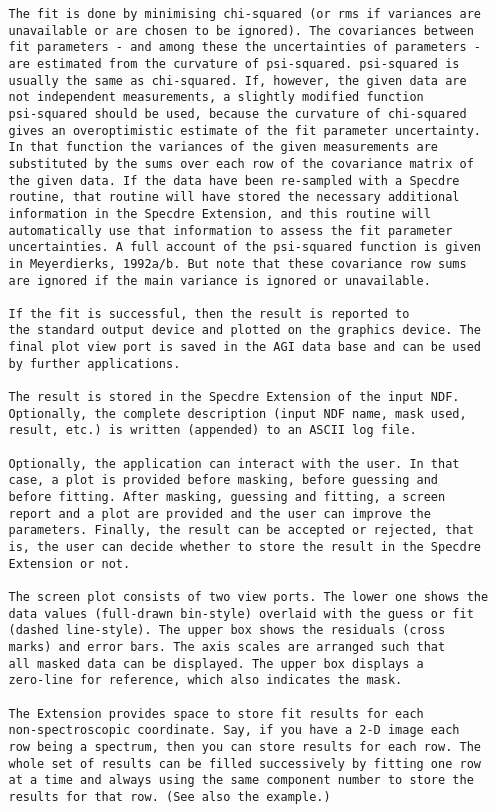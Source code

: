 \begin{description}
\begin{verbatim}
   The fit is done by minimising chi-squared (or rms if variances are
   unavailable or are chosen to be ignored). The covariances between
   fit parameters - and among these the uncertainties of parameters -
   are estimated from the curvature of psi-squared. psi-squared is
   usually the same as chi-squared. If, however, the given data are
   not independent measurements, a slightly modified function
   psi-squared should be used, because the curvature of chi-squared
   gives an overoptimistic estimate of the fit parameter uncertainty.
   In that function the variances of the given measurements are
   substituted by the sums over each row of the covariance matrix of
   the given data. If the data have been re-sampled with a Specdre
   routine, that routine will have stored the necessary additional
   information in the Specdre Extension, and this routine will
   automatically use that information to assess the fit parameter
   uncertainties. A full account of the psi-squared function is given
   in Meyerdierks, 1992a/b. But note that these covariance row sums
   are ignored if the main variance is ignored or unavailable.

   If the fit is successful, then the result is reported to
   the standard output device and plotted on the graphics device. The
   final plot view port is saved in the AGI data base and can be used
   by further applications.

   The result is stored in the Specdre Extension of the input NDF.
   Optionally, the complete description (input NDF name, mask used,
   result, etc.) is written (appended) to an ASCII log file.

   Optionally, the application can interact with the user. In that
   case, a plot is provided before masking, before guessing and
   before fitting. After masking, guessing and fitting, a screen
   report and a plot are provided and the user can improve the
   parameters. Finally, the result can be accepted or rejected, that
   is, the user can decide whether to store the result in the Specdre
   Extension or not.

   The screen plot consists of two view ports. The lower one shows the
   data values (full-drawn bin-style) overlaid with the guess or fit
   (dashed line-style). The upper box shows the residuals (cross
   marks) and error bars. The axis scales are arranged such that
   all masked data can be displayed. The upper box displays a
   zero-line for reference, which also indicates the mask.

   The Extension provides space to store fit results for each
   non-spectroscopic coordinate. Say, if you have a 2-D image each
   row being a spectrum, then you can store results for each row. The
   whole set of results can be filled successively by fitting one row
   at a time and always using the same component number to store the
   results for that row. (See also the example.)


\end{verbatim}
\end{description}
